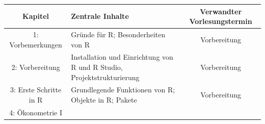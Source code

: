 \documentclass[]{tufte-book}
\begin{document}
\begin{longtable}[]{@{}clc@{}}
\toprule
\begin{minipage}[b]{0.24\columnwidth}\centering\strut
Kapitel\strut
\end{minipage} & \begin{minipage}[b]{0.34\columnwidth}\raggedright\strut
Zentrale Inhalte\strut
\end{minipage} & \begin{minipage}[b]{0.34\columnwidth}\centering\strut
Verwandter Vorlesungstermin\strut
\end{minipage}\tabularnewline
\midrule
\endhead
\begin{minipage}[t]{0.24\columnwidth}\centering\strut
1: Vorbemerkungen\strut
\end{minipage} & \begin{minipage}[t]{0.34\columnwidth}\raggedright\strut
Gründe für R; Besonderheiten von R\strut
\end{minipage} & \begin{minipage}[t]{0.34\columnwidth}\centering\strut
Vorbereitung\strut
\end{minipage}\tabularnewline
\begin{minipage}[t]{0.24\columnwidth}\centering\strut
2: Vorbereitung\strut
\end{minipage} & \begin{minipage}[t]{0.34\columnwidth}\raggedright\strut
Installation und Einrichtung von R und R Studio,
Projektstrukturierung\strut
\end{minipage} & \begin{minipage}[t]{0.34\columnwidth}\centering\strut
Vorbereitung\strut
\end{minipage}\tabularnewline
\begin{minipage}[t]{0.24\columnwidth}\centering\strut
3: Erste Schritte in R\strut
\end{minipage} & \begin{minipage}[t]{0.34\columnwidth}\raggedright\strut
Grundlegende Funktionen von R; Objekte in R; Pakete\strut
\end{minipage} & \begin{minipage}[t]{0.34\columnwidth}\centering\strut
Vorbereitung\strut
\end{minipage}\tabularnewline
\begin{minipage}[t]{0.24\columnwidth}\centering\strut
4: Ökonometrie I\strut
\end{minipage} & \begin{minipage}[t]{0.34\columnwidth}\raggedright\strut

\end{minipage}
\end{longtable}
\end{document}
